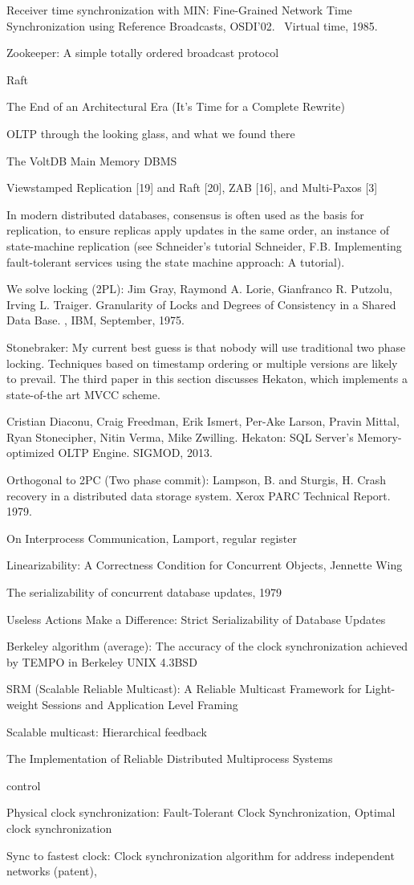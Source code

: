 Receiver time synchronization with MIN:
Fine-Grained Network Time Synchronization using Reference
Broadcasts, OSDI'02.~\cite{elson2002fine}
Virtual time, 1985.~\cite{jefferson1985virtual}


Zookeeper: A simple totally ordered broadcast protocol

Raft

The End of an Architectural Era
(It’s Time for a Complete Rewrite)

OLTP through the looking glass, and what we found there

The VoltDB Main Memory DBMS

Viewstamped Replication [19] and Raft [20], ZAB [16], and Multi-Paxos [3]

In modern distributed databases, consensus is often used as the basis for replication, to ensure replicas apply updates in the same order, an instance of state-machine replication (see Schneider’s tutorial Schneider, F.B. Implementing fault-tolerant services using the state machine approach: A tutorial).

We solve locking (2PL): Jim Gray, Raymond A. Lorie, Gianfranco R. Putzolu, Irving L. Traiger. Granularity of Locks and Degrees of Consistency in a Shared Data Base. , IBM, September, 1975.

Stonebraker: My current best guess is that nobody will use traditional two phase locking. Techniques based on timestamp ordering or multiple versions are likely to prevail. The third paper in this section discusses Hekaton, which implements a state-of-the art MVCC scheme.

Cristian Diaconu, Craig Freedman, Erik Ismert, Per-Ake Larson, Pravin Mittal, Ryan Stonecipher, Nitin Verma, Mike Zwilling. Hekaton: SQL Server's Memory-optimized OLTP Engine. SIGMOD, 2013.



Orthogonal to 2PC (Two phase commit):
Lampson, B. and Sturgis, H. Crash recovery in a distributed data storage system. Xerox PARC Technical Report. 1979.

On Interprocess Communication, Lamport, regular register

Linearizability: A Correctness Condition for
Concurrent Objects, Jennette Wing

The serializability of concurrent database updates, 1979

Useless Actions Make a Difference:
Strict Serializability of Database Updates

Berkeley algorithm (average):
The accuracy of the clock synchronization achieved by TEMPO in Berkeley UNIX 4.3BSD

SRM (Scalable Reliable Multicast):
A Reliable Multicast Framework for Light-weight Sessions
and Application Level Framing

Scalable multicast:
Hierarchical feedback 

The Implementation of Reliable Distributed Multiprocess Systems

control~\cite{tanenbaum2007distributed}


Physical clock synchronization: Fault-Tolerant Clock Synchronization, 
Optimal clock synchronization

Sync to fastest clock: Clock synchronization algorithm for address independent networks (patent),
\fi
